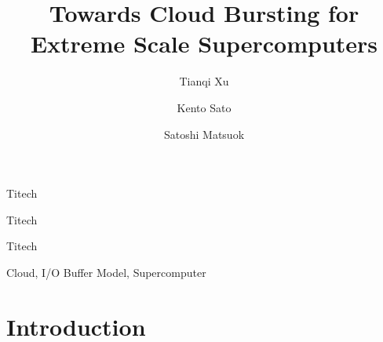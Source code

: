 \documentclass[JIP]{ipsj}
\begin{document}
\title{Towards Cloud Bursting for Extreme Scale Supercomputers}

\author{Tianqi Xu}{Titech}
\author{Kento Sato}{Titech}
\author{Satoshi Matsuok}{Titech}

\begin{abstract}
\end{abstract}

\begin{keyword}
	Cloud, I/O Buffer Model, Supercomputer
\end{keyword}

\maketitle

\section{Introduction}
\end{document}
